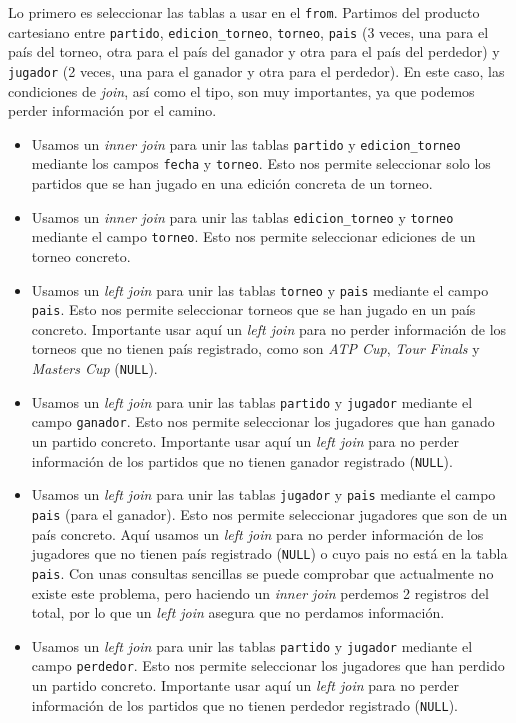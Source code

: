 Lo primero es seleccionar las tablas a usar en el \texttt{from}. Partimos del producto cartesiano entre \texttt{partido}, \texttt{edicion\_torneo}, \texttt{torneo}, \texttt{pais} (3 veces, una para el país del torneo, otra para el país del ganador y otra para el país del perdedor) y \texttt{jugador} (2 veces, una para el ganador y otra para el perdedor). En este caso, las condiciones de \textit{join}, así como el tipo, son muy importantes, ya que podemos perder información por el camino. 
\begin{itemize}
\item Usamos un \textit{inner join} para unir las tablas \texttt{partido} y \texttt{edicion\_torneo} mediante los campos \texttt{fecha} y \texttt{torneo}. Esto nos permite seleccionar solo los partidos que se han jugado en una edición concreta de un torneo.
\item Usamos un \textit{inner join} para unir las tablas \texttt{edicion\_torneo} y \texttt{torneo} mediante el campo \texttt{torneo}. Esto nos permite seleccionar ediciones de un torneo concreto.
\item Usamos un \textit{left join} para unir las tablas \texttt{torneo} y \texttt{pais} mediante el campo \texttt{pais}. Esto nos permite seleccionar torneos que se han jugado en un país concreto. Importante usar aquí un \textit{left join} para no perder información de los torneos que no tienen país registrado, como son \textit{ATP Cup}, \textit{Tour Finals} y \textit{Masters Cup} (\texttt{NULL}).
\item Usamos un \textit{left join} para unir las tablas \texttt{partido} y \texttt{jugador} mediante el campo \texttt{ganador}. Esto nos permite seleccionar los jugadores que han ganado un partido concreto. Importante usar aquí un \textit{left join} para no perder información de los partidos que no tienen ganador registrado (\texttt{NULL}).
\item Usamos un \textit{left join} para unir las tablas \texttt{jugador} y \texttt{pais} mediante el campo \texttt{pais} (para el ganador). Esto nos permite seleccionar jugadores que son de un país concreto. Aquí usamos un \textit{left join} para no perder información de los jugadores que no tienen país registrado (\texttt{NULL}) o cuyo pais no está en la tabla \texttt{pais}. Con unas consultas sencillas se puede comprobar que actualmente no existe este problema, pero haciendo un \textit{inner join} perdemos 2 registros del total, por lo que un \textit{left join} asegura que no perdamos información.
\item Usamos un \textit{left join} para unir las tablas \texttt{partido} y \texttt{jugador} mediante el campo \texttt{perdedor}. Esto nos permite seleccionar los jugadores que han perdido un partido concreto. Importante usar aquí un \textit{left join} para no perder información de los partidos que no tienen perdedor registrado (\texttt{NULL}). 

\end{itemize}

